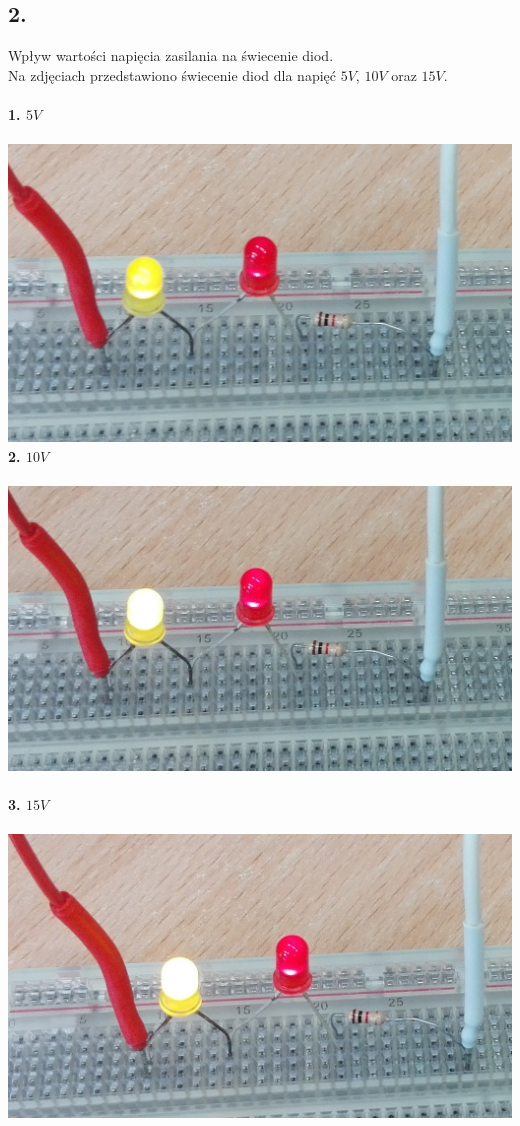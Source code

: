 \documentclass[polish,a4paper]{article}
\begin{document}
\newpage

\subsection*{2.}
Wpływ wartości napięcia zasilania na świecenie diod.\\
Na zdjęciach przedstawiono świecenie diod dla napięć $5V$, $10V$ oraz $15V$.\\
\\
\textbf{1. $5V$}\\
\\
\includegraphics[width=\textwidth]{5v}
\\
\newpage
\textbf{2. $10V$}\\
\\
\includegraphics[width=\textwidth]{10v}
\\
\\
\textbf{3. $15V$}\\
\\
\includegraphics[width=\textwidth]{15V}
\\
\end{document}
